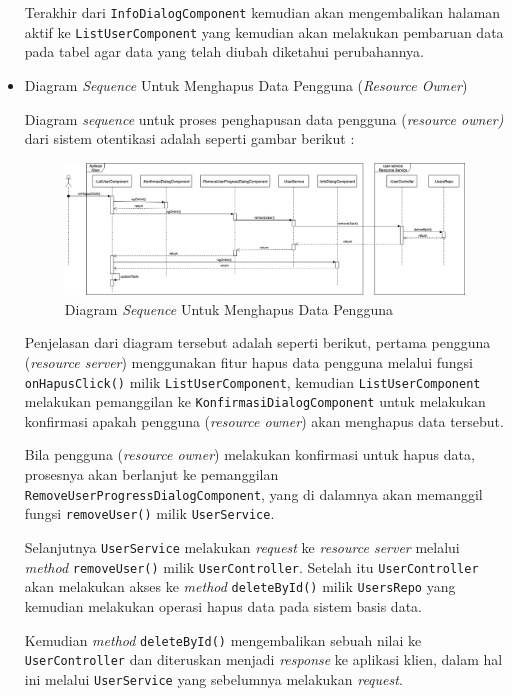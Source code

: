 \documentclass[pdftex,12pt, oneside]{article}
\begin{document}
\begin{itemize}
	Terakhir dari \texttt{InfoDialogComponent} kemudian akan mengembalikan halaman aktif ke \texttt{ListUserComponent} yang kemudian akan melakukan pembaruan data pada tabel agar data yang telah diubah diketahui perubahannya.
	
	\item Diagram \textit{Sequence} Untuk Menghapus Data Pengguna (\textit{Resource Owner})
	
	Diagram \textit{sequence} untuk proses penghapusan data pengguna (\textit{resource owner)} dari sistem otentikasi adalah seperti gambar berikut :
	
	\begin{figure}[H]
		\centering
		\includegraphics[width=1\textwidth]{./resources/seq-del-user}
		\caption{Diagram \textit{Sequence} Untuk Menghapus Data Pengguna}
		\label{fig:seq-del-user}
	\end{figure}
	
	Penjelasan dari diagram tersebut adalah seperti berikut, pertama pengguna (\textit{resource server}) menggunakan fitur hapus data pengguna melalui fungsi \texttt{onHapusClick()} milik \texttt{ListUserComponent}, kemudian \texttt{ListUserComponent} melakukan pemanggilan ke \texttt{KonfirmasiDialogComponent} untuk melakukan konfirmasi apakah pengguna (\textit{resource owner}) akan menghapus data tersebut.
	
	Bila pengguna (\textit{resource owner}) melakukan konfirmasi untuk hapus data, prosesnya akan berlanjut ke pemanggilan \texttt{RemoveUserProgressDialogComponent}, yang di dalamnya akan memanggil fungsi \texttt{removeUser()} milik \texttt{UserService}.
	
	Selanjutnya \texttt{UserService} melakukan \textit{request} ke \textit{resource server} melalui \textit{method} \texttt{removeUser()} milik \texttt{UserController}. Setelah itu \texttt{UserController} akan melakukan akses ke \textit{method} \texttt{deleteById()} milik \texttt{UsersRepo} yang kemudian melakukan operasi hapus data pada sistem basis data.
	
	Kemudian \textit{method} \texttt{deleteById()} mengembalikan sebuah nilai ke \texttt{UserController} dan diteruskan menjadi \textit{response} ke aplikasi klien, dalam hal ini melalui \texttt{UserService} yang sebelumnya melakukan \textit{request}.
	

\end{itemize}
\end{document}
